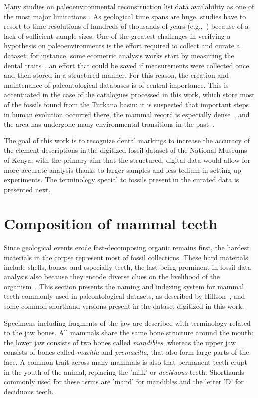 \documentclass[english,twoside,openright]{UH_DS_MSc}
\begin{document}
Many studies on paleoenvironmental reconstruction list data availability as one of the most major limitations~\cite{oksanenHumboldtianApproachLife2019,fortelius}.
As geological time spans are huge, studies have to 
resort to time resolutions of hundreds of thousands of years (e.g.,~\cite {fortelius}) because of a lack 
of sufficient sample sizes. One of the greatest challenges in verifying a hypothesis on 
paleoenvironments is the effort required to collect and curate a dataset; for instance, some ecometric
analysis works start by measuring the dental traits~\cite{fortelius}, an effort that could be saved 
if measurements were collected once and then stored in a structured manner. For this reason, the 
creation and maintenance of paleontological databases is of central importance. This is accentuated 
in the case of the catalogues processed in this work, which store most of the fossils found from the Turkana basin: it is suspected that
important steps in human evolution occurred there, the mammal record is especially dense~\cite{fortelius}, and the area has undergone many environmental transitions in the past~\cite{Zliobaite2023}.

The goal of this work is to recognize dental markings to increase the accuracy of the element descriptions in
the digitized fossil dataset of the National Museums of Kenya,
with the primary aim that the structured, digital data would allow for 
more accurate analysis thanks to larger samples and less tedium in 
setting up experiments. The terminology special to fossils present in 
the curated data is presented next.

\section{Composition of mammal teeth}
\label{sect:mammal_teeth}

Since geological events erode fast-decomposing organic remains first, the hardest materials in 
the corpse represent most of fossil collections. These hard materials include shells, bones, and especially teeth, the last being prominent in fossil data analysis also because they encode diverse clues on 
the livelihood of the organism~\cite{Faith_Lyman_2019}.
This section presents the naming and indexing system for mammal teeth commonly used in paleontological datasets,
as described by Hillson~\cite{Hillson_2005}, and some common shorthand versions present in the dataset digitized in this work.

Specimens including fragments of the jaw are described with terminology related 
to the jaw bones. All mammals share the same bone structure around the mouth: the lower jaw consists 
of two bones called \textit{mandibles}, whereas the upper jaw consists of bones called 
\textit{maxilla} and \textit{premaxilla}, that also form large parts of the face.
A common trait across many mammals is also that permanent teeth erupt in the 
youth of the animal, replacing the 'milk' or \textit{deciduous} teeth. Shorthands commonly used for these 
terms are 'mand' for mandibles and the letter 'D' for deciduous teeth.
\end{document}
